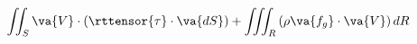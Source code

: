 \begin{equation}
  \iint_S\va{V} \cdot\left(\rttensor{\tau}\cdot\va{dS}\right) 
  + \iiint_R\left(\rho \va{f_g}\cdot\va{V}\right)dR
\end{equation}

